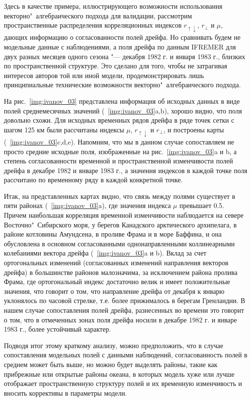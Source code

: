 Здесь в качестве примера, иллюстрирующего возможности использования векторно"~алгебраического подхода для валидации, рассмотрим пространственные распределения корреляционных индексов $r_{\uparrow\downarrow}$, $r_{\perp}$ и $\mu$, дающих информацию о согласованности полей дрейфа. Но сравнивать будем не модельные данные с наблюдениями, а поля дрейфа по данным IFREMER для двух разных месяцев одного сезона "--- декабря 1982 г. и января 1983 г., близких по пространственной структуре. Это сделано для того, чтобы не затрагивая интересов авторов той или иной модели, продемонстрировать лишь принципиальные технические возможности векторно"~алгебраического подхода.

На рис.~\ref{img:ivanov_03} представлена информация об исходных данных в виде полей среднемесячных значений (~\ref{img:ivanov_03}a,b), хорошо видно, что поля довольно схожи. Для исходных временных рядов дрейфа в ряде точек сетки с шагом 125 км были рассчитаны индексы $\mu$, $r_{\uparrow\downarrow}$ и $r_{\perp}$, и построены карты (~\ref{img:ivanov_03}c,d,e). Напомним, что мы в данном случае сопоставляем не просто средние исходные поля, изображенные на рис.~\ref{img:ivanov_03}a и b, а степень согласованности временной и пространственной изменчивости полей дрейфа в декабре 1982 и январе 1983 г., а значения индексов в каждой точке поля рассчитано по временному ряду в каждой конкретной точке.

Итак, на представленных картах видно, что связь между полями существует в пяти районах (~\ref{img:ivanov_03}a), где значения индекса $\mu$ превышает 0.5. Причем наибольшая корреляция временной изменчивости наблюдается на севере Восточно"~Сибирского моря, у берегов Канадского арктического архипелага, в районе котловины Амундсена, в проливе Фрама и в море Баффина, и она обусловлена в основном согласованными однонаправленными коллинеарными колебаниями вектора дрейфа (~\ref{img:ivanov_03}a и b). Вклад за счет ортогональных изменений (согласованных изменений направления векторов дрейфа) в большинстве районов малозначима, за исключением района пролива Фрама, где ортогональный индекс достаточно велик и имеет положительные значения, что говорит о том, что направление дрейфа от декабря к январю уклонялось по часовой стрелке, т.е. более прижималось в берегам Гренландии. В нашем случае сопоставления полей дрейфа, разнесенных во времени это говорит о том, что в отмеченных зонах поля дрейфа носили в декабре 1982 г. и январе 1983 г., более устойчивый характер. 

Подводя итог этому краткому анализу, можно предположить, что в случае сопоставления модельных полей с данными наблюдений, согласованность полей в среднем может быть выше, но можно будет выделять районы, такие как прибрежные или открытые районы океана, в которых модель хуже или лучше отображает пространственную структуру полей и их временную изменчивость и вносить коррективы в параметры модели.
  

